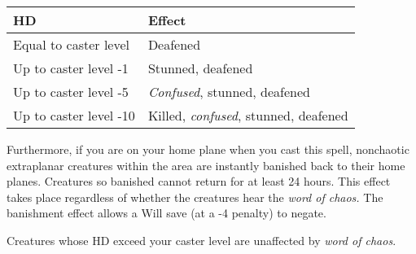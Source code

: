 \begin{longtable}{llll}
\hline
\multicolumn{1}{|p{1.369in}|}{\begin{minipage}[t]{1.369in}\raggedright
\textbf{HD}\end{minipage}} & \multicolumn{1}{p{2.133in}|}{\begin{minipage}[t]{2.133in}\raggedright
\textbf{Effect}\end{minipage}}\\
\hline
\multicolumn{1}{p{0.069in}|}{\begin{minipage}[t]{0.069in}\raggedright
Equal to caster level\end{minipage}} & \multicolumn{1}{p{0.069in}|}{\begin{minipage}[t]{0.069in}\raggedright
Deafened\end{minipage}}\\
\hline
\multicolumn{1}{|p{1.369in}|}{\begin{minipage}[t]{1.369in}\raggedright
Up to caster level -1\end{minipage}} & \multicolumn{1}{p{2.133in}|}{\begin{minipage}[t]{2.133in}\raggedright
Stunned, deafened\end{minipage}}\\
\hline
\multicolumn{1}{p{0.069in}|}{\begin{minipage}[t]{0.069in}\raggedright
Up to caster level -5\end{minipage}} & \multicolumn{1}{p{0.069in}|}{\begin{minipage}[t]{0.069in}\raggedright
\textit{Confused}, stunned, deafened\end{minipage}}\\
\hline
\multicolumn{1}{|p{1.369in}|}{\begin{minipage}[t]{1.369in}\raggedright
Up to caster level -10\end{minipage}} & \multicolumn{3}{p{2.272in}|}{\begin{minipage}[t]{2.272in}\raggedright
Killed, \textit{confused}, stunned, deafened\end{minipage}}\\
\hline
\end{longtable}

Furthermore, if you are on your home plane when you cast this spell, nonchaotic 
extraplanar creatures within the area are instantly banished back to their home 
planes. Creatures so banished cannot return for at least 24 hours. This effect 
takes place regardless of whether the creatures hear the \textit{word of chaos. 
}The banishment effect allows a Will save (at a -4 penalty) to negate.

Creatures whose HD exceed your caster level are unaffected by \textit{word of chaos}.

